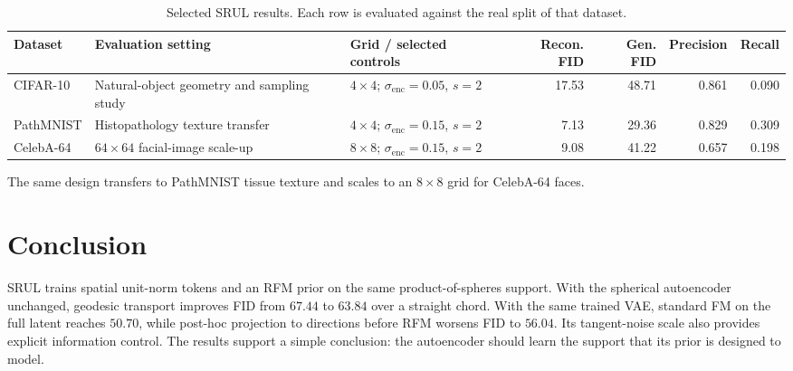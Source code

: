 \documentclass{article}
\begin{document}
\begin{table}[H]
\centering
\scriptsize
\caption{Selected SRUL results. Each row is evaluated against the real split of that dataset.}
\label{tab:domains}
\setlength{\tabcolsep}{2.8pt}
\renewcommand{\arraystretch}{1.08}
\begin{tabular}{p{1.25cm}p{3.0cm}p{2.2cm}rrrr}
\toprule
Dataset & Evaluation setting & Grid / selected controls & Recon. FID & Gen. FID & Precision & Recall \\
\midrule
CIFAR-10 & Natural-object geometry and sampling study & $4\times4$; $\sigma_{\mathrm{enc}}=0.05$, $s=2$ & 17.53 & 48.71 & 0.861 & 0.090 \\
PathMNIST & Histopathology texture transfer & $4\times4$; $\sigma_{\mathrm{enc}}=0.15$, $s=2$ & 7.13 & 29.36 & 0.829 & 0.309 \\
CelebA-64 & $64\times64$ facial-image scale-up & $8\times8$; $\sigma_{\mathrm{enc}}=0.15$, $s=2$ & 9.08 & 41.22 & 0.657 & 0.198 \\
\bottomrule
\end{tabular}
\end{table}
The same design transfers to PathMNIST tissue texture and scales to an $8\times8$ grid for CelebA-64 faces.

\section{Conclusion}
SRUL trains spatial unit-norm tokens and an RFM prior on the same product-of-spheres support. With the spherical autoencoder unchanged, geodesic transport improves FID from $67.44$ to $63.84$ over a straight chord. With the same trained VAE, standard FM on the full latent reaches $50.70$, while post-hoc projection to directions before RFM worsens FID to $56.04$. Its tangent-noise scale also provides explicit information control. The results support a simple conclusion: the autoencoder should learn the support that its prior is designed to model.
\end{document}
